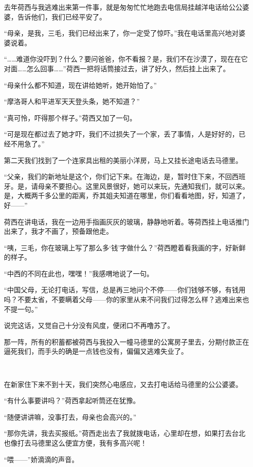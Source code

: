 \par 去年荷西与我逃难出来第一件事，就是匆匆忙忙地跑去电信局挂越洋电话给公公婆婆，告诉他们，我们已经平安了。
\par “母亲，是我，三毛，我们已经出来了，你一定受了惊吓。”我在电话里高兴地对婆婆说着。
\par “……难道你没吓到？什么？要问爸爸，你不看报？是，我们不在沙漠了，现在在它对面……怎么回事……”荷西一把将话筒接过去，讲了好久，然后挂上出来了。
\par “母亲什么都不知道，现在讲给她听，她开始怕了。”
\par “摩洛哥人和平进军天天登头条，她不知道？”
\par “真可怜，吓得那个样子。”荷西又加了一句。
\par “可是现在都过去了她才吓，我们不过损失了一个家，丢了事情，人是好好的，已经不用急了。”
\par 第二天我们找到了一个连家具出租的美丽小洋房，马上又挂长途电话去马德里。
\par “父亲，我们的新地址是这个，你们记下来。在海边，是，暂时住下来，不回西班牙。是，请母亲不要担心。这里风景很好，她可以来玩，先通知我们，就可以来。是，大概两千多公里的距离，乔其姐夫知道在哪里，你们看看地图，好，知道了，好——”
\par 荷西在讲电话，我在一边用手指画灰灰的玻璃，静静地听着。等荷西挂上电话推门出来了，我才不画了，预备跟他走。
\par “咦，三毛，你在玻璃上写了那么多‘钱’字做什么？”荷西瞪着看我画的字，好新鲜的样子。
\par “中西的不同在此也，嘿嘿！”我感喟地说了一句。
\par “中国父母，无论打电话，写信，总是再三地问个不停——你们钱够不够，有钱用吗？不要太省，不要瞒着父母——你的家里从来不问我们过得怎么样？逃难出来也不提一句。”
\par 说完这话，又觉自己十分没有风度，便闭口不再噜苏了。
\par 那一阵，所有的积蓄都被荷西与我投入一幢马德里的公寓房子里去，分期付款正在逼死我们，而手头的确是一点钱也没有，偏偏又逃难失业了。
\par  
\par 在新家住下来不到十天，我们突然心电感应，又去打电话给马德里的公公婆婆。
\par “有什么事要讲吗？”荷西拿起听筒还在犹豫。
\par “随便讲讲嘛，没事打去，母亲也会高兴的。”
\par “那你先讲，我去买报纸。”荷西走出去了我就拨电话，心里却在想，如果打去台北也像打去马德里这么便宜方便，我有多高兴呢！
\par “喂——”娇滴滴的声音。
